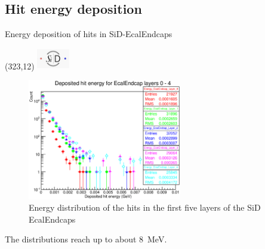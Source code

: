 \documentclass[xcolor={dvipsnames}]{beamer}
\newcommand{\sidlogo}{
  \setlength{\TPHorizModule}{1pt}
  \setlength{\TPVertModule}{1pt}
  \begin{textblock}{1}(323,12)
   \includegraphics[width=40pt,height=26pt]{figures/SiD.jpeg}
  \end{textblock}
  }
\begin{document}
\subsection{Hit energy deposition}
\begin{frame}{Energy deposition of hits in SiD-EcalEndcaps}
\sidlogo
 \begin{figure}
 \centering
  \includegraphics[width=0.6\textwidth]{figures/sidloi3_pairs_1312_EcalEndcap_Hits_EcalEndcap_Energy_EcalEndcap_Layer_0-4.eps}
 \caption{Energy distribution of the hits in the first five layers of the SiD EcalEndcaps}
 \end{figure}
The distributions reach up to about \SI{8}{\mega\electronvolt}.
\end{frame}
\end{document}
